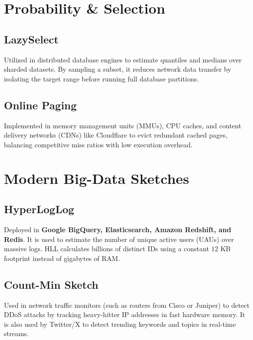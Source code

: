 \documentclass[twoside,12pt]{book}
\theoremstyle{plain}
\theoremstyle{definition}
\theoremstyle{remark}
\begin{document}
\section{Probability \& Selection}

\subsection{LazySelect}
Utilized in distributed database engines to estimate quantiles and medians over 
sharded datasets. By sampling a subset, it reduces network data transfer by isolating 
the target range before running full database partitions.

\subsection{Online Paging}
Implemented in memory management units (MMUs), CPU caches, and content delivery networks 
(CDNs) like Cloudflare to evict redundant cached pages, balancing competitive miss 
ratios with low execution overhead.

\section{Modern Big-Data Sketches}

\subsection{HyperLogLog}
Deployed in \textbf{Google BigQuery, Elasticsearch, Amazon Redshift, and Redis}. It is used to 
estimate the number of unique active users (UAUs) over massive logs. HLL calculates 
billions of distinct IDs using a constant $12$ KB footprint instead of gigabytes of RAM.

\subsection{Count-Min Sketch}
Used in network traffic monitors (such as routers from Cisco or Juniper) to detect 
DDoS attacks by tracking heavy-hitter IP addresses in fast hardware memory. It is also 
used by Twitter/X to detect trending keywords and topics in real-time streams.
\end{document}
